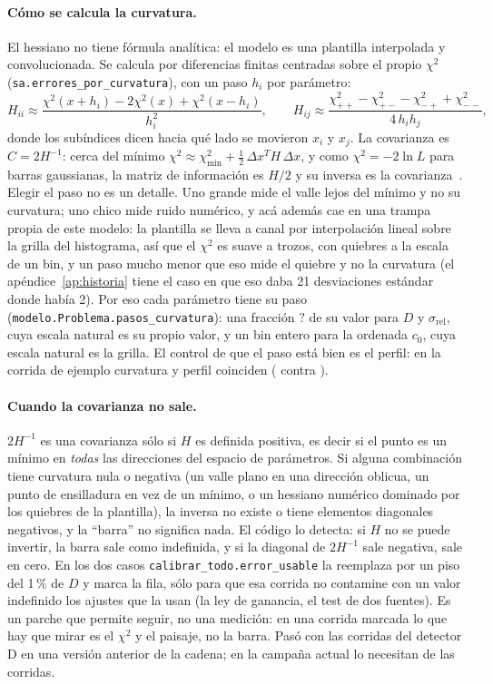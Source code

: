 \documentclass[11pt,a4paper]{article}
\newcommand{\faltaMacro}{\textbf{?}}
\providecommand{\PasoCurvRel}{\faltaMacro}\providecommand{\DeltaChiUnoD}{\faltaMacro}
\begin{document}
\paragraph{Cómo se calcula la curvatura.} El hessiano no tiene fórmula
analítica: el modelo es una plantilla interpolada y convolucionada. Se
calcula por diferencias finitas centradas sobre el propio $\chi^2$
(\texttt{sa.errores\_por\_curvatura}), con un paso $h_i$ por parámetro:
\[
   H_{ii} \approx \frac{\chi^2(x + h_i) - 2\chi^2(x) + \chi^2(x - h_i)}{h_i^2},
   \qquad
   H_{ij} \approx \frac{\chi^2_{++} - \chi^2_{+-} - \chi^2_{-+} + \chi^2_{--}}
                       {4\,h_ih_j},
\]
donde los subíndices dicen hacia qué lado se movieron $x_i$ y $x_j$. La
covarianza es $C = 2H^{-1}$: cerca del mínimo
$\chi^2 \approx \chi^2_{\min} + \tfrac12\,\Delta x^{T}H\,\Delta x$, y como
$\chi^2 = -2\ln L$ para barras gaussianas, la matriz de información es
$H/2$ y su inversa es la covarianza~\cite{cowan1998}. Elegir el paso no es
un detalle. Uno grande mide el valle lejos del mínimo y no su curvatura; uno
chico mide ruido numérico, y acá además cae en una trampa propia de este
modelo: la plantilla se lleva a canal por interpolación lineal sobre la
grilla del histograma, así que el $\chi^2$ es suave a trozos, con quiebres a
la escala de un bin, y un paso mucho menor que eso mide el quiebre y no la
curvatura (el apéndice~\ref{ap:historia} tiene el caso en que eso daba 21
desviaciones estándar donde había 2). Por eso cada parámetro tiene su paso
(\texttt{modelo.Problema.pasos\_curvatura}): una fracción $\PasoCurvRel$ de
su valor para $D$ y $\sigma_{\text{rel}}$, cuya escala natural es su propio
valor, y un bin entero para la ordenada $c_0$, cuya escala natural es la
grilla. El control de que el paso está bien es el perfil: en la corrida de
ejemplo curvatura y perfil coinciden (\EjErrCurv{} contra \EjErrPerfil).

\paragraph{Cuando la covarianza no sale.} $2H^{-1}$ es una covarianza sólo si
$H$ es definida positiva, es decir si el punto es un mínimo en \emph{todas}
las direcciones del espacio de parámetros. Si alguna combinación tiene
curvatura nula o negativa (un valle plano en una dirección oblicua, un punto
de ensilladura en vez de un mínimo, o un hessiano numérico dominado por los
quiebres de la plantilla), la inversa no existe o tiene elementos diagonales
negativos, y la ``barra'' no significa nada. El código lo detecta: si $H$ no
se puede invertir, la barra sale como indefinida, y si la diagonal de
$2H^{-1}$ sale negativa, sale en cero. En los dos casos
\texttt{calibrar\_todo.error\_usable} la reemplaza por un piso del 1\,\% de
$D$ y marca la fila, sólo para que esa corrida no contamine con un valor
indefinido los ajustes que la usan (la ley de ganancia, el test de dos
fuentes). Es un parche que permite seguir, no una medición: en una corrida
marcada lo que hay que mirar es el $\chi^2$ y el paisaje, no la barra. Pasó
con las corridas del detector D en una versión anterior de la cadena; en la
campaña actual lo necesitan \NErrorParche{} de las \NCorridas{} corridas.
\end{document}
